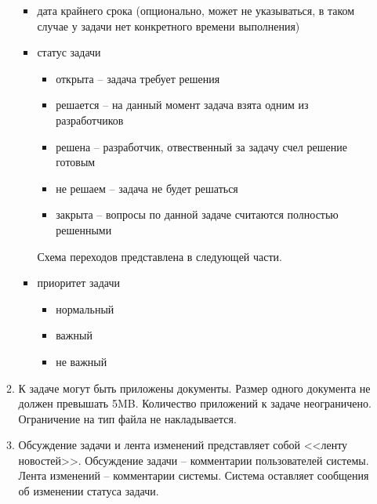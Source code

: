 \documentclass[14pt,a4paper]{extarticle}
\begin{document}
\begin{enumerate}
\begin{enumerate}
\begin{itemize}
				\item дата крайнего срока (опционально, может не указываться, в таком случае у задачи нет конкретного времени выполнения)
				
				\item статус задачи
				\begin{itemize}
					\item открыта -- задача требует решения
					\item решается -- на данный момент задача взята одним из разработчиков
					\item решена -- разработчик, отвественный за задачу счел решение готовым
					\item не решаем -- задача не будет решаться
					\item закрыта -- вопросы по данной задаче считаются полностью решенными
				\end{itemize}
				Схема переходов представлена в следующей части.
				
				\item приоритет задачи
				\begin{itemize}
					\item нормальный
					\item важный
					\item не важный
				\end{itemize}
			\end{itemize}
			
			\item К задаче могут быть приложены документы. Размер одного документа не должен превышать 5MB. Количество приложений к задаче неограничено. Ограничение на тип файла не накладывается.
			
			\item Обсуждение задачи и лента изменений представляет собой <<ленту новостей>>. Обсуждение задачи -- комментарии пользователей системы. Лента изменений -- комментарии системы. Система оставляет сообщения об изменении статуса задачи.
		\end{enumerate}
		

\end{enumerate}
\end{document}
